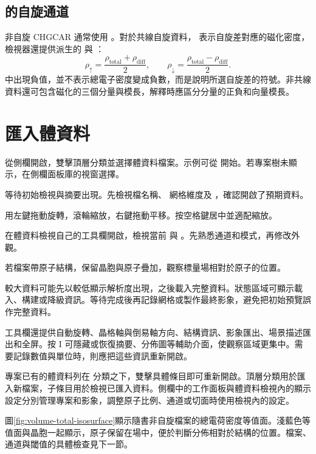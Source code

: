 \subsection{ 的自旋通道}

非自旋 CHGCAR 通常使用 。對於共線自旋資料， 表示自旋差對應的磁化密度，檢視器還提供派生的  與 ：
\[
  \rho_{\uparrow}=\frac{\rho_{\mathrm{total}}+\rho_{\mathrm{diff}}}{2},
  \qquad
  \rho_{\downarrow}=\frac{\rho_{\mathrm{total}}-\rho_{\mathrm{diff}}}{2}.
\]
 中出現負值，並不表示總電子密度變成負數，而是說明所選自旋差的符號。非共線資料還可包含磁化的三個分量與模長，解釋時應區分分量的正負和向量模長。

\section{匯入體資料}

\begin{steps}
  \item 從側欄開啟，雙擊頂層分類並選擇體資料檔案。示例可從  開始。若專案樹未顯示，在側欄面板庫的視窗選擇。
  \item 等待初始檢視與摘要出現。先檢視檔名稱、 網格維度及 ，確認開啟了預期資料。
  \item 用左鍵拖動旋轉，滾輪縮放，右鍵拖動平移。按空格鍵居中並適配縮放。
  \item 在體資料檢視自己的工具欄開啟，檢視當前  與 。先熟悉通道和模式，再修改外觀。
  \item 若檔案帶原子結構，保留晶胞與原子疊加，觀察標量場相對於原子的位置。
\end{steps}

較大資料可能先以較低顯示解析度出現，之後載入完整資料。狀態區域可顯示載入、構建或降級資訊。等待完成後再記錄網格或製作最終影象，避免把初始預覽誤作完整資料。

工具欄還提供自動旋轉、晶格軸與倒易軸方向、結構資訊、影象匯出、場景描述匯出和全屏。按 I 可隱藏或恢復摘要、分佈圖等輔助介面，使觀察區域更集中。需要記錄數值與單位時，則應把這些資訊重新開啟。

專案已有的體資料列在  分類之下，雙擊具體條目即可重新開啟。頂層分類用於匯入新檔案，子條目用於檢視已匯入資料。側欄中的工作面板與體資料檢視內的顯示設定分別管理專案和影象，調整原子比例、通道或切面時使用檢視內的設定。

圖\ref{fig:volume-total-isosurface}顯示隨書非自旋檔案的總電荷密度等值面。淺藍色等值面與晶胞一起顯示，原子保留在場中，便於判斷分佈相對於結構的位置。檔案、通道與閾值的具體檢查見下一節。

